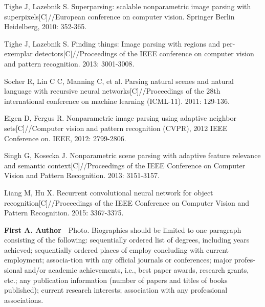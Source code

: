 \documentclass[10.5pt,compsoc]{TsT}
\theoremstyle{mystyle}
\begin{document}
{\begin{thebibliography}{99}
Tighe J, Lazebnik S. Superparsing: scalable nonparametric image parsing with superpixels[C]//European conference on computer vision. Springer Berlin Heidelberg, 2010: 352-365.

Tighe J, Lazebnik S. Finding things: Image parsing with regions and per-exemplar detectors[C]//Proceedings of the IEEE conference on computer vision and pattern recognition. 2013: 3001-3008.

Socher R, Lin C C, Manning C, et al. Parsing natural scenes and natural language with recursive neural networks[C]//Proceedings of the 28th international conference on machine learning (ICML-11). 2011: 129-136.

Eigen D, Fergus R. Nonparametric image parsing using adaptive neighbor sets[C]//Computer vision and pattern recognition (CVPR), 2012 IEEE Conference on. IEEE, 2012: 2799-2806.

Singh G, Kosecka J. Nonparametric scene parsing with adaptive feature relevance and semantic context[C]//Proceedings of the IEEE Conference on Computer Vision and Pattern Recognition. 2013: 3151-3157.

Liang M, Hu X. Recurrent convolutional neural network for object recognition[C]//Proceedings of the IEEE Conference on Computer Vision and Pattern Recognition. 2015: 3367-3375.

\begin{strip}
\end{strip}

\begin{biography}
\noindent
\textbf{First A. Author}\ \  Photo. Biographies should be limited to one paragraph consisting of the following: sequentially ordered list of degrees, including years achieved; sequentially ordered places of employ concluding with current employment; associa-tion with any official journals or conferences; major profes-sional and/or academic achievements, i.e., best paper awards, research grants, etc.; any publication information (number of papers and titles of books published); current research interests; association with any professional associations.
\end{biography}


\end{thebibliography}}
\end{document}
